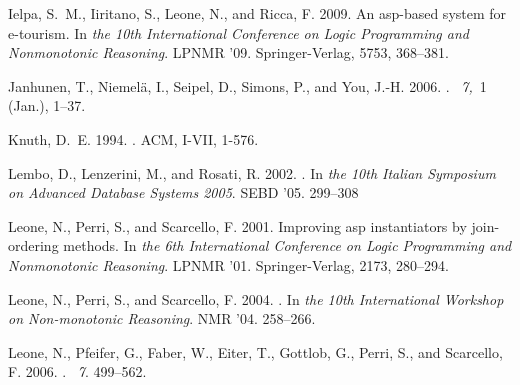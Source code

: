 \documentclass[preprint]{tlp}
\begin{document}
\begin{thebibliography}
{\sc Ielpa, S.~M.}, {\sc Iiritano, S.}, {\sc Leone, N.}, {\sc and} {\sc Ricca,
  F.} 2009.
\newblock An asp-based system for e-tourism.
\newblock In {\em the 10th International Conference on Logic
  Programming and Nonmonotonic Reasoning}. LPNMR '09. Springer-Verlag, 5753, 368--381.

{\sc Janhunen, T.}, {\sc Niemel{\"a}, I.}, {\sc Seipel, D.}, {\sc Simons, P.},
  {\sc and} {\sc You, J.-H.} 2006.
.
~{\em 7,\/}~1
  (Jan.), 1--37.

{\sc Knuth, D.~E.} 1994.
.
\newblock ACM, I-VII, 1-576.

{\sc Lembo, D.}, {\sc Lenzerini, M.}, {\sc and} {\sc Rosati, R.} 2002.
.
\newblock In {\em the 10th Italian Symposium on
  Advanced Database Systems 2005}. SEBD '05. 299--308

{\sc Leone, N.}, {\sc Perri, S.}, {\sc and} {\sc Scarcello, F.} 2001.
\newblock Improving asp instantiators by join-ordering methods.
\newblock In {\em the 6th International Conference on Logic
  Programming and Nonmonotonic Reasoning}. LPNMR '01. Springer-Verlag, 2173, 280--294.

{\sc Leone, N.}, {\sc Perri, S.}, {\sc and} {\sc Scarcello, F.} 2004.
.
\newblock In {\em the 10th International Workshop on
  Non-monotonic Reasoning}. NMR '04. 258--266.

{\sc Leone, N.}, {\sc Pfeifer, G.}, {\sc Faber, W.}, {\sc Eiter, T.}, {\sc
  Gottlob, G.}, {\sc Perri, S.}, {\sc and} {\sc Scarcello, F.} 2006.
.
~{\em 7\/}. 499--562.


\end{thebibliography}
\end{document}
